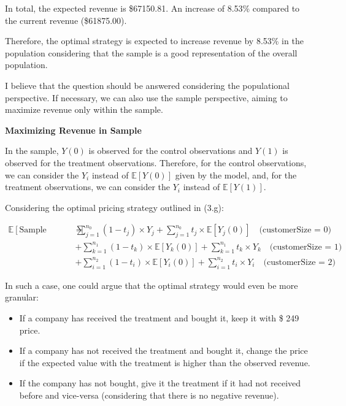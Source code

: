 \documentclass{article}
\begin{document}
In total, the expected revenue is \$67150.81. An increase of 8.53\% compared to the current revenue (\$61875.00).

Therefore, the optimal strategy is expected to increase revenue by 8.53\% in the population considering that the sample is a good representation of the overall population.

I believe that the question should be answered considering the populational perspective. If necessary, we can also use the sample perspective, aiming to maximize revenue only within the sample.

\textbf{Maximizing Revenue in Sample}

In the sample, $Y(0)$ is observed for the control observations and $Y(1)$ is observed for the treatment observations.
Therefore, for the control observations, we can consider the $Y_i$ instead of $\mathbb{E}[Y(0)]$ given by the model, and, for the treatment observations, we can consider the $Y_i$ instead of $\mathbb{E}[Y(1)]$.

Considering the optimal pricing strategy outlined in (3.g):

\begin{align*}
    \mathbb{E}[\text{Sample Revenue}] =& \sum_{j = 1}^{n_0} (1 - t_j) \times Y_j
    + \sum_{j = 1}^{n_0} t_j \times \mathbb{E}[Y_j(0)] \quad \text{(customerSize = 0)} \\
    & + \sum_{k = 1}^{n_1} (1 - t_k) \times \mathbb{E}[Y_k(0)]
    + \sum_{k = 1}^{n_1} t_k \times Y_k \quad \text{(customerSize = 1)} \\
    & + \sum_{i = 1}^{n_2} (1 - t_i) \times \mathbb{E}[Y_i(0)]
    + \sum_{i = 1}^{n_2} t_i \times Y_i \quad \text{(customerSize = 2)}
\end{align*}

In such a case, one could argue that the optimal strategy would even be more granular:
\begin{itemize}
    \item If a company has received the treatment and bought it, keep it with \$ 249 price.
    \item If a company has not received the treatment and bought it, change the price if the expected value with the treatment is higher than the observed revenue.
    \item If the company has not bought, give it the treatment if it had not received before and vice-versa (considering that there is no negative revenue).
\end{itemize}
\end{document}
